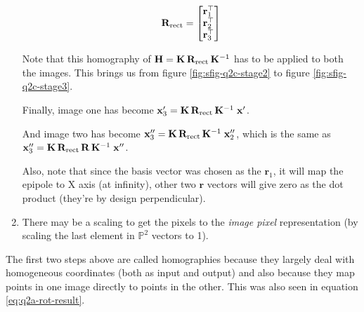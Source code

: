 \begin{enumerate}
    \begin{equation}
        \mathbf{R}_{\textup{rect}} = \begin{bmatrix} \mathbf{r}_1^\top \\ \mathbf{r}_2^\top \\ \mathbf{r}_3^\top \end{bmatrix}
    \end{equation}

    Note that this homography of $\mathbf{H} = \mathbf{K} \, \mathbf{R}_{\textup{rect}} \, \mathbf{K}^{-1}$ has to be applied to both the images. This brings us from figure \ref{fig:sfig-q2c-stage2} to figure \ref{fig:sfig-q2c-stage3}.

    Finally, image one has become $\mathbf{x}'_3 = \mathbf{K} \, \mathbf{R}_{\textup{rect}} \, \mathbf{K}^{-1} \; \mathbf{x}'$.

    And image two has become $\mathbf{x}''_3 = \mathbf{K} \, \mathbf{R}_{\textup{rect}} \, \mathbf{K}^{-1} \; \mathbf{x}''_2$, which is the same as $\mathbf{x}''_3 = \mathbf{K} \, \mathbf{R}_{\textup{rect}} \, \mathbf{R} \, \mathbf{K}^{-1} \; \mathbf{x}''$.

    Also, note that since the basis vector was chosen as the $\mathbf{r}_1$, it will map the epipole to X axis (at infinity), other two $\mathbf{r}$ vectors will give zero as the dot product (they're by design perpendicular).

    \item There may be a scaling to get the pixels to the \textit{image pixel} representation (by scaling the last element in $\mathbb{P}^2$ vectors to 1).

\end{enumerate}

The first two steps above are called homographies because they largely deal with homogeneous coordinates (both as input and output) and also because they map points in one image directly to points in the other. This was also seen in equation \ref{eq:q2a-rot-result}.

